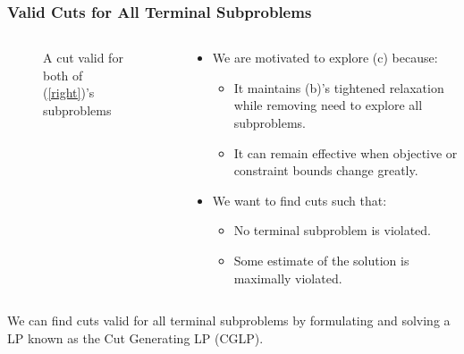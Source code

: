 \documentclass{beamer}
\begin{document}
	\begin{frame}[t]
		\frametitle{Valid Cuts for All Terminal Subproblems}
		\small
		\begin{columns}[T]
			\begin{column}{0.4\textwidth}
				\vspace{-.25cm}
				\begin{figure}[h]
					\caption{A cut valid for both of (\ref{right})'s subproblems}
					\label{p:hull}
				\end{figure}
			\end{column}
			\begin{column}{0.6\textwidth}
				\begin{itemize}
					\item We are motivated to explore (c) because:
					\begin{itemize}
						\item It maintains (b)'s tightened relaxation while removing need to explore all subproblems.
						\item It can remain effective when objective or constraint bounds change greatly.
					\end{itemize}
					\item We want to find cuts such that:
					\begin{itemize}
						\item No terminal subproblem is violated.
						\item Some estimate of the solution is maximally violated.
					\end{itemize}
				\end{itemize}
			\end{column}
		\end{columns}
		\vspace{.5cm}
		\begin{block}{}
			We can find cuts valid for all terminal subproblems by formulating and solving a LP known as the Cut Generating LP (CGLP).
		\end{block}
		\normalsize
	\end{frame}
\end{document}
